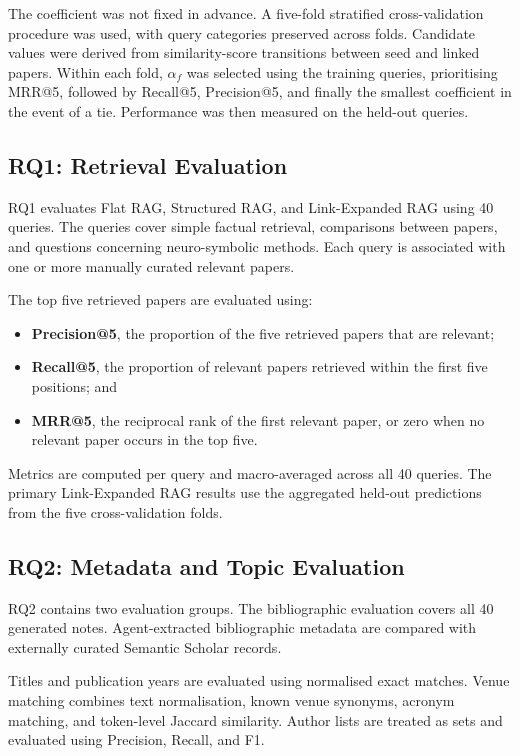 \documentclass[runningheads]{llncs}
\begin{document}
The coefficient was not fixed in advance. A five-fold stratified cross-validation procedure was used, with query categories preserved across folds. Candidate values were derived from similarity-score transitions between seed and linked papers. Within each fold, \(\alpha_f\) was selected using the training queries, prioritising MRR@5, followed by Recall@5, Precision@5, and finally the smallest coefficient in the event of a tie. Performance was then measured on the held-out queries.

\subsection{RQ1: Retrieval Evaluation}
\label{sec:rq1_method}

RQ1 evaluates Flat RAG, Structured RAG, and Link-Expanded RAG using 40 queries. The queries cover simple factual retrieval, comparisons between papers, and questions concerning neuro-symbolic methods. Each query is associated with one or more manually curated relevant papers.

The top five retrieved papers are evaluated using:
\begin{itemize}
    \item \textbf{Precision@5}, the proportion of the five retrieved papers that are relevant;
    \item \textbf{Recall@5}, the proportion of relevant papers retrieved within the first five positions; and
    \item \textbf{MRR@5}, the reciprocal rank of the first relevant paper, or zero when no relevant paper occurs in the top five.
\end{itemize}
Metrics are computed per query and macro-averaged across all 40 queries. The primary Link-Expanded RAG results use the aggregated held-out predictions from the five cross-validation folds.

\subsection{RQ2: Metadata and Topic Evaluation}
\label{sec:rq2_method}

RQ2 contains two evaluation groups. The bibliographic evaluation covers all 40 generated notes. Agent-extracted bibliographic metadata are compared with externally curated Semantic Scholar records.

Titles and publication years are evaluated using normalised exact matches. Venue matching combines text normalisation, known venue synonyms, acronym matching, and token-level Jaccard similarity. Author lists are treated as sets and evaluated using Precision, Recall, and F1.
\end{document}
